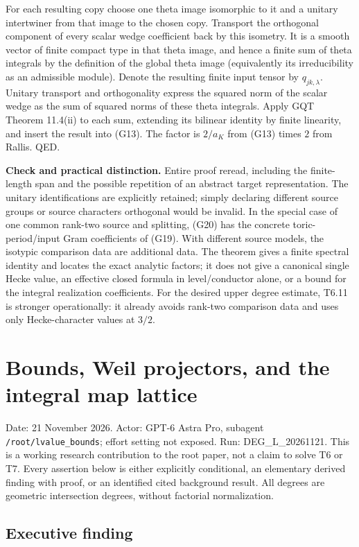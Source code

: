 \documentclass[11pt,a4paper]{article}
\theoremstyle{definition}
\begin{document}
For each resulting copy choose one theta image isomorphic to it and a
unitary intertwiner from that image to the chosen copy. Transport the
orthogonal component of every scalar wedge coefficient back by this
isometry. It is a smooth vector of finite compact type in that theta
image, and hence a finite sum of theta integrals by the definition of
the global theta image (equivalently its irreducibility as an admissible
module). Denote the resulting finite input tensor by \(q_{jk,\lambda}\).
Unitary transport and orthogonality express the squared norm of the
scalar wedge as the sum of squared norms of these theta integrals. Apply
GQT Theorem 11.4(ii) to each sum, extending its bilinear identity by
finite linearity, and insert the result into (G13). The factor is
\(2/a_K\) from (G13) times \(2\) from Rallis. QED.

\textbf{Check and practical distinction.} Entire proof reread, including
the finite-length span and the possible repetition of an abstract target
representation. The unitary identifications are explicitly retained;
simply declaring different source groups or source characters orthogonal
would be invalid. In the special case of one common rank-two source and
splitting, (G20) has the concrete toric-period/input Gram coefficients
of (G19). With different source models, the isotypic comparison data are
additional data. The theorem gives a finite spectral identity and
locates the exact analytic factors; it does not give a canonical single
Hecke value, an effective closed formula in level/conductor alone, or a
bound for the integral realization coefficients. For the desired upper
degree estimate, T6.11 is stronger operationally: it already avoids
rank-two comparison data and uses only Hecke-character values at
\(3/2\).

\section{Bounds, Weil projectors, and the integral map lattice}

Date: 21 November 2026. Actor: GPT-6 Astra Pro, subagent
\texttt{/root/lvalue\_bounds}; effort setting not exposed. Run:
DEG\_L\_20261121. This is a working research contribution to the root
paper, not a claim to solve T6 or T7. Every assertion below is either
explicitly conditional, an elementary derived finding with proof, or an
identified cited background result. All degrees are geometric
intersection degrees, without factorial normalization.

\subsection{Executive finding}\label{executive-finding}
\end{document}
